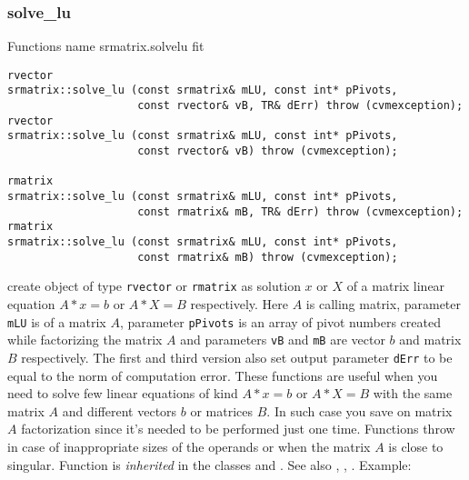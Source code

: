 \subsubsection{solve\_lu}
Functions%
\pdfdest name {srmatrix.solvelu} fit
\begin{verbatim}
rvector
srmatrix::solve_lu (const srmatrix& mLU, const int* pPivots,
                    const rvector& vB, TR& dErr) throw (cvmexception);
rvector
srmatrix::solve_lu (const srmatrix& mLU, const int* pPivots,
                    const rvector& vB) throw (cvmexception);

rmatrix
srmatrix::solve_lu (const srmatrix& mLU, const int* pPivots,
                    const rmatrix& mB, TR& dErr) throw (cvmexception);
rmatrix
srmatrix::solve_lu (const srmatrix& mLU, const int* pPivots,
                    const rmatrix& mB) throw (cvmexception);
\end{verbatim}
create  object of type \verb"rvector" or \verb"rmatrix" as
 solution $x$ or $X$ of a matrix linear equation
$A*x=b$ or $A*X=B$ respectively. Here $A$ is  calling
matrix, 
parameter \verb"mLU" is 
of a matrix $A$, parameter \verb"pPivots" is an array of pivot numbers
created while factorizing the matrix $A$
and parameters \verb"vB" and \verb"mB" are  vector $b$ and
matrix $B$ respectively.
The first and third version also set output parameter \verb"dErr" to be equal
to the norm of computation error.
These functions are useful when you need to solve few linear equations
of kind $A*x=b$ or $A*X=B$ with the same matrix $A$ and different vectors $b$ 
or matrices $B$.
In such case you save on matrix $A$ factorization since it's needed to be
performed just one time.
Functions throw 
in case of inappropriate sizes
of the operands or when the matrix $A$ is close to singular.
Function is \emph{inherited} in the classes
and .
See also
,
,
.
Example:

